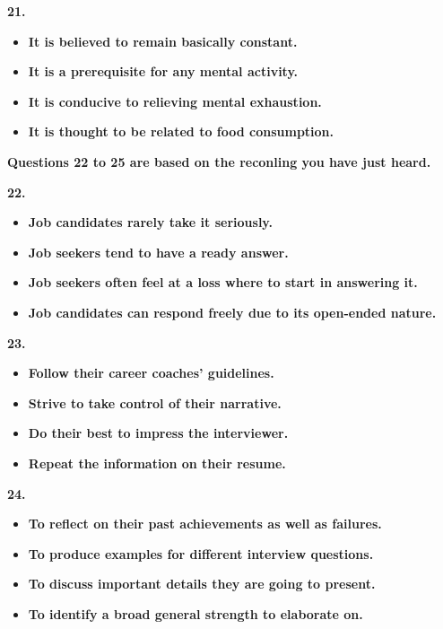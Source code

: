 \documentclass[UTF8,11pt]{ctexart}
\begin{document}
\textbf{21.}


\begin{itemize}[leftmargin=2em,itemsep=.2em,topsep=.4em]\item[A.] \textbf{It is believed to remain basically constant.}
\item[B.] \textbf{It is a prerequisite for any mental activity.}
\item[C.] \textbf{It is conducive to relieving mental exhaustion.}
\item[D.] \textbf{It is thought to be related to food consumption.}
\end{itemize}

\textbf{Questions 22 to 25 are based on the reconling you have just heard.}


\textbf{22.}


\begin{itemize}[leftmargin=2em,itemsep=.2em,topsep=.4em]\item[A.] \textbf{Job candidates rarely take it seriously.}
\item[B.] \textbf{Job seekers tend to have a ready answer.}
\item[C.] \textbf{Job seekers often feel at a loss where to start in answering it.}
\item[D.] \textbf{Job candidates can respond freely due to its open-ended nature.}
\end{itemize}

\textbf{23.}


\begin{itemize}[leftmargin=2em,itemsep=.2em,topsep=.4em]\item[A.] \textbf{Follow their career coaches' guidelines.}
\item[B.] \textbf{Strive to take control of their narrative.}
\item[C.] \textbf{Do their best to impress the interviewer.}
\item[D.] \textbf{Repeat the information on their resume.}
\end{itemize}

\textbf{24.}


\begin{itemize}[leftmargin=2em,itemsep=.2em,topsep=.4em]\item[A.] \textbf{To reflect on their past achievements as well as failures.}
\item[B.] \textbf{To produce examples for different interview questions.}
\item[C.] \textbf{To discuss important details they are going to present.}
\item[D.] \textbf{To identify a broad general strength to elaborate on.}
\end{itemize}
\end{document}
